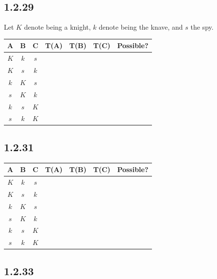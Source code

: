 \documentclass[12pt,titlepage]{extarticle}
\begin{document}
\subsection*{1.2.29}
Let $K$ denote being a knight, $k$ denote being the knave, and $s$ the spy.

\newcommand{\Yes}{\ding{51}}
\newcommand{\Noo}{\ding{55}}

\begin{center}
    \begin{tabular}{c|c|c||c|c|c||c}
        A & B & C       & T(A) & T(B) & T(C) & Possible? \\\hline
        $K$ & $k$ & $s$ & \Yes & \Noo & \Yes & \Noo \\\hline
        $K$ & $s$ & $k$ & \Yes & \Yes & \Yes & \Yes \\\hline
        $k$ & $K$ & $s$ & \Yes & \Noo & \Yes & \Noo \\\hline
        $s$ & $K$ & $k$ & \Yes & \Noo & \Noo & \Noo \\\hline
        $k$ & $s$ & $K$ & \Yes & \Yes & \Noo & \Noo \\\hline
        $s$ & $k$ & $K$ & \Yes & \Noo & \Noo & \Noo
    \end{tabular}
\end{center}

\subsection*{1.2.31}

\begin{center}
    \begin{tabular}{c|c|c||c|c|c||c}
        A & B & C       & T(A) & T(B) & T(C) & Possible? \\\hline
        $K$ & $k$ & $s$ & \Yes & \Noo & \Yes & \Noo \\\hline
        $K$ & $s$ & $k$ & \Yes & \Yes & \Yes & \Yes \\\hline
        $k$ & $K$ & $s$ & \Yes & \Noo & \Yes & \Noo \\\hline
        $s$ & $K$ & $k$ & \Yes & \Noo & \Yes & \Noo \\\hline
        $k$ & $s$ & $K$ & \Yes & \Yes & \Noo & \Noo \\\hline
        $s$ & $k$ & $K$ & \Yes & \Yes & \Noo & \Noo
    \end{tabular}
\end{center}

\subsection*{1.2.33}
\end{document}
